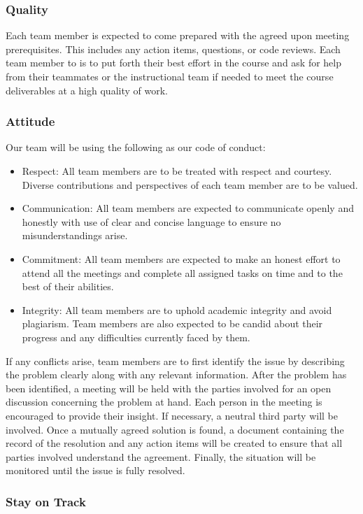 \documentclass{article}
\begin{document}
\subsubsection*{Quality}

Each team member is expected to come prepared with the agreed upon meeting prerequisites. This includes
any action items, questions, or code reviews. Each team member to is to put forth their best effort in the
course and ask for help from their teammates or the instructional team if needed to meet the course
deliverables at a high quality of work.

\subsubsection*{Attitude}

Our team will be using the following as our code of conduct:
\begin{itemize}
\item Respect: All team members are to be treated with respect and courtesy. Diverse contributions and
perspectives of each team member are to be valued.
\item Communication: All team members are expected to communicate openly and honestly with use of
clear and concise language to ensure no misunderstandings arise.
\item Commitment: All team members are expected to make an honest effort to attend all the meetings and
complete all assigned tasks on time and to the best of their abilities.
\item Integrity: All team members are to uphold academic integrity and avoid plagiarism. Team members are
also expected to be candid about their progress and any difficulties currently faced by them.
\end{itemize}
If any conflicts arise, team members are to first identify the issue by describing the problem clearly along with
any relevant information. After the problem has been identified, a meeting will be held with the parties
involved for an open discussion concerning the problem at hand. Each person in the meeting is encouraged
to provide their insight. If necessary, a neutral third party will be involved. Once a mutually agreed solution is
found, a document containing the record of the resolution and any action items will be created to ensure that
all parties involved understand the agreement. Finally, the situation will be monitored until the issue is fully
resolved.

\subsubsection*{Stay on Track}
\end{document}
